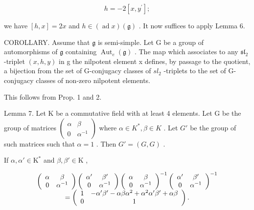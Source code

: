 \[
h = - 2 [ x, y ^ {\prime} ];
\]

we have \([h,x]=2x\) and \(h\in(\operatorname{ad}x)(\mathfrak{g})\) . It now suffices to apply Lemma 6.

COROLLARY. Assume that \(\mathfrak{g}\) is semi-simple. Let \(\mathrm{G}\) be a group of automorphisms of \(\mathfrak{g}\) containing \(\operatorname{Aut}_e(\mathfrak{g})\) . The map which associates to any \(\mathfrak{sl}_2\) -triplet \((x,h,y)\) in g the nilpotent element x defines, by passage to the quotient, a bijection from the set of G-conjugacy classes of \(sl_{2}\) -triplets to the set of G-conjugacy classes of non-zero nilpotent elements.

This follows from Prop. 1 and 2.

Lemma 7. Let K be a commutative field with at least 4 elements. Let G be the group of matrices \(\begin{pmatrix}\alpha&\beta\\0&\alpha^{-1}\end{pmatrix}\) where \(\alpha\in K^{*},\beta\in K\) . Let \(G'\) be the group of such matrices such that \(\alpha=1\) . Then \(G'=(G,G)\) .

If \(\alpha, \alpha' \in \mathrm{K}^*\) and \(\beta, \beta' \in \mathrm{K}\) ,

\[
\begin{array}{c} \left( \begin{array}{c c} \alpha & \beta \\ 0 & \alpha^ {- 1} \end{array} \right) \left( \begin{array}{c c} \alpha^ {\prime} & \beta^ {\prime} \\ 0 & \alpha^ {- 1} \end{array} \right) \left( \begin{array}{c c} \alpha & \beta \\ 0 & \alpha^ {- 1} \end{array} \right) ^ {- 1} \left( \begin{array}{c c} \alpha^ {\prime} & \beta^ {\prime} \\ 0 & \alpha^ {- 1} \end{array} \right) ^ {- 1} \\ = \left( \begin{array}{c c} 1 & - \alpha^ {\prime} \beta^ {\prime} - \alpha \beta \alpha^ {2} + \alpha^ {2} \alpha^ {\prime} \beta^ {\prime} + \alpha \beta \\ 0 & 1 \end{array} \right). \end{array}
\]

